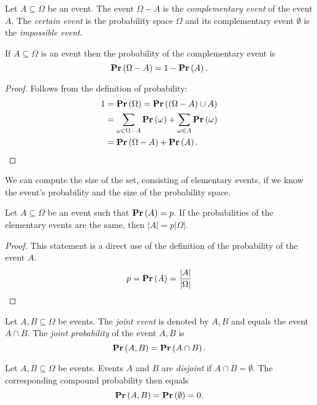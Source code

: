 \begin{definition}
Let $A \subseteq \Omega$ be an event. The event $\Omega - A$ is the \emph{complementary event} of the event $A$. The \emph{certain event} is the probability space $\Omega$ and its complementary event $\emptyset$ is the \emph{impossible event}.
\end{definition}

\begin{corollary}
If $A \subseteq \Omega$ is an event then the probability of the complementary event is 
\[ 
	\mathbf{Pr}\left(\Omega - A\right) = 1 - \mathbf{Pr}\left(A\right) \text{.} 
\] 
\end{corollary}
\begin{proof}
Follows from the definition of probability:
\[
\begin{split}
1 
	& = \mathbf{Pr}\left(\Omega\right) = \mathbf{Pr}\left((\Omega - A) \cup A\right) \\
	& = \displaystyle\sum_{\omega \in \Omega - A} \mathbf{Pr}\left(\omega\right) + \displaystyle\sum_{\omega \in A} \mathbf{Pr}\left(\omega\right) \\
	& = \mathbf{Pr}\left(\Omega - A\right) + \mathbf{Pr}\left(A\right) \text{.}
\end{split}
\]
\end{proof}

We can compute the size of the set, consisting of elementary events, if we know the event's probability and the size of the probability space.

\begin{lemma}
Let $A \subseteq \Omega$ be an event such that $\mathbf{Pr}\left(A\right) = p$. If the probabilities of the elementary events are the same, then $|A| = p |\Omega|$.
\end{lemma}
\begin{proof}
This statement is a direct use of the definition of the probability of the event $A$.
\[
p = \mathbf{Pr}\left(A\right) = \frac{|A|}{|\Omega|}
\]
\end{proof}

\begin{definition}
Let $A, B \subseteq \Omega$ be events. The \emph{joint event} is denoted by $A, B$ and equals the event $A \cap B$. The \emph{joint probability} of the event $A, B$ is
\[
\mathbf{Pr}\left(A, B\right) = \mathbf{Pr}\left(A \cap B\right) \text{.}
\]
\end{definition}

\begin{definition}
Let $A, B \subseteq \Omega$ be events. Events $A$ and $B$ are \emph{disjoint} if $A \cap B = \emptyset$. The corresponding compound probability then equals
\[
\mathbf{Pr}\left(A, B\right) = \mathbf{Pr}\left(\emptyset\right) = 0 \text{.}
\]
\end{definition}

